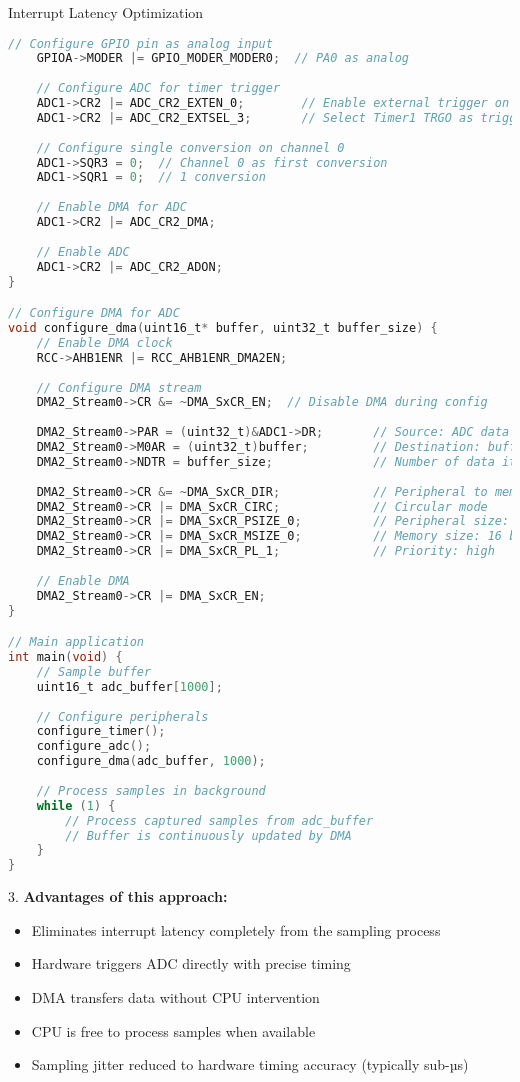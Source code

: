 \begin{example2}{Interrupt Latency Optimization}
\begin{lstlisting}[language=C, style=basesmol]
    // Configure GPIO pin as analog input
    GPIOA->MODER |= GPIO_MODER_MODER0;  // PA0 as analog
    
    // Configure ADC for timer trigger
    ADC1->CR2 |= ADC_CR2_EXTEN_0;        // Enable external trigger on rising edge
    ADC1->CR2 |= ADC_CR2_EXTSEL_3;       // Select Timer1 TRGO as trigger
    
    // Configure single conversion on channel 0
    ADC1->SQR3 = 0;  // Channel 0 as first conversion
    ADC1->SQR1 = 0;  // 1 conversion
    
    // Enable DMA for ADC
    ADC1->CR2 |= ADC_CR2_DMA;
    
    // Enable ADC
    ADC1->CR2 |= ADC_CR2_ADON;
}

// Configure DMA for ADC
void configure_dma(uint16_t* buffer, uint32_t buffer_size) {
    // Enable DMA clock
    RCC->AHB1ENR |= RCC_AHB1ENR_DMA2EN;
    
    // Configure DMA stream
    DMA2_Stream0->CR &= ~DMA_SxCR_EN;  // Disable DMA during config
    
    DMA2_Stream0->PAR = (uint32_t)&ADC1->DR;       // Source: ADC data register
    DMA2_Stream0->M0AR = (uint32_t)buffer;         // Destination: buffer
    DMA2_Stream0->NDTR = buffer_size;              // Number of data items
    
    DMA2_Stream0->CR &= ~DMA_SxCR_DIR;             // Peripheral to memory
    DMA2_Stream0->CR |= DMA_SxCR_CIRC;             // Circular mode
    DMA2_Stream0->CR |= DMA_SxCR_PSIZE_0;          // Peripheral size: 16 bits
    DMA2_Stream0->CR |= DMA_SxCR_MSIZE_0;          // Memory size: 16 bits
    DMA2_Stream0->CR |= DMA_SxCR_PL_1;             // Priority: high
    
    // Enable DMA
    DMA2_Stream0->CR |= DMA_SxCR_EN;
}

// Main application
int main(void) {
    // Sample buffer
    uint16_t adc_buffer[1000];
    
    // Configure peripherals
    configure_timer();
    configure_adc();
    configure_dma(adc_buffer, 1000);
    
    // Process samples in background
    while (1) {
        // Process captured samples from adc_buffer
        // Buffer is continuously updated by DMA
    }
}
\end{lstlisting}

3. \textbf{Advantages of this approach:}
   \begin{itemize}
     \item Eliminates interrupt latency completely from the sampling process
     \item Hardware triggers ADC directly with precise timing
     \item DMA transfers data without CPU intervention
     \item CPU is free to process samples when available
     \item Sampling jitter reduced to hardware timing accuracy (typically sub-µs)
   \end{itemize}


\end{example2}
